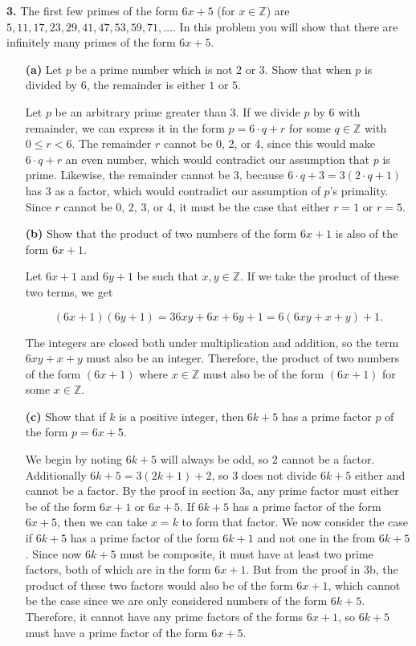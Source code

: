 \documentclass[12pt]{amsart}
\def\ZZ{{\mathbb Z}}
\begin{document}
{\bf 3.}  The first few primes of the form $6x+5$ (for $x\in\ZZ$) are $5,11,17,23,29,41,47,53,59,71,\dots$.  In this problem you will show that there are infinitely many primes of the form $6x+5$.
\begin{itemize}
\item[{\bf (a)}] Let $p$ be a prime number which is not $2$ or $3$.  Show that when $p$ is divided by $6$, the remainder is either $1$ or $5$.

\medskip

Let $p$ be an arbitrary prime greater than 3. If we divide $p$ by 6 with remainder, we can express it in the form $p = 6 \cdot q + r$ for some $q \in \ZZ$ with $0 \leq r < 6$. The remainder $r$ cannot be 0, 2, or 4, since this would make $6 \cdot q + r$ an even number, which would contradict our assumption that $p$ is prime. Likewise, the remainder cannot be 3, because $6 \cdot q + 3 = 3(2\cdot q + 1)$ has 3 as a factor, which would contradict our assumption of $p$'s primality. Since $r$ cannot be 0, 2, 3, or 4, it must be the case that either $r = 1$ or $r = 5$.

\medskip

\item[{\bf (b)}] Show that the product of two numbers of the form $6x+1$ is also of the form $6x+1$.

\medskip

Let $6x + 1$ and $6y+1$ be such that $x,y\in\ZZ$. If we take the product of these two terms, we get 

\[(6x + 1)(6y + 1) = 36xy + 6x + 6y + 1 = 6(6xy+x+y)+1. \]

The integers are closed both under multiplication and addition, so the term $6xy + x + y$ must also be an integer. Therefore, the product of two numbers of the form $(6x+1)$ where $x\in\ZZ$ must also be of the form $(6x + 1)$ for some $x \in \ZZ$.

\medskip

\item[{\bf (c)}] Show that if $k$ is a positive integer, then $6k+5$ has a prime factor $p$ of the form $p=6x+5$.   

\medskip

We begin by noting $6k + 5$ will always be odd, so 2 cannot be a factor. Additionally $6k + 5 = 3(2k + 1) + 2$, so 3 does not divide $6k+5$ either and cannot be a factor. By the proof in section 3a, any prime factor must either be of the form $6x + 1$ or $6x + 5$. If $6k + 5$ has a prime factor of the form $6x + 5$, then we can take $x = k$ to form that factor. We now consider the case if $6k + 5$ has a prime factor of the form $6k + 1$ and not one in the from $6k+5$. Since now $6k + 5$ must be composite, it must have at least two prime factors, both of which are in the form $6x + 1$. But from the proof in 3b, the product of these two factors would also be of the form $6x + 1$, which cannot be the case since we are only considered numbers of the form $6k + 5$. Therefore, it cannot have any prime factors of the forms $6x +1$, so $6k + 5$ must have a prime factor of the form $6x + 5$. 


\end{itemize}
\end{document}
